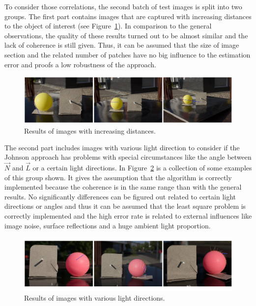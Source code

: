 To consider those correlations, the second batch of test images is split into two groups. The first part contains images that are captured with increasing distances to the object of interest (see Figure~\ref{fig:difDistance}). In comparison to the general observations, the quality of these results turned out to be almost similar and the lack of coherence is still given. Thus, it can be assumed that the size of image section and the related number of patches have no big influence to the estimation error and proofs a low robustness of the approach. 
\begin{figure}[H] 

	\center 
	\includegraphics[width=\linewidth]{Images/versch_Anstaende.jpg}
	\caption[Bildunterschrift]{Results of images with increasing distances.}
		\label{fig:difDistance}		
\end{figure}
The second part includes images with various light direction to consider if the Johnson approach has problems with special circumstances like the angle between $\vec{N}$ and $\vec{L}$ or a certain light directions. In Figure~\ref{fig:divLightDirect} is a collection of some examples of this group shown. It gives the assumption that the algorithm is correctly implemented because the coherence is in the same range than with the general results. No significantly differences can be figured out related to certain light directions or angles and thus it can be assumed that the least square problem is correctly implemented and the high error rate is related to external influences like image noise, surface reflections and a huge ambient light proportion.
\begin{figure}[H] 

	\center 
	\includegraphics[width=\linewidth]{Images/versch_Lichtrichtungen.jpg}
	\caption[Bildunterschrift]{Results of images with various light directions.}
		\label{fig:divLightDirect}		
\end{figure}

